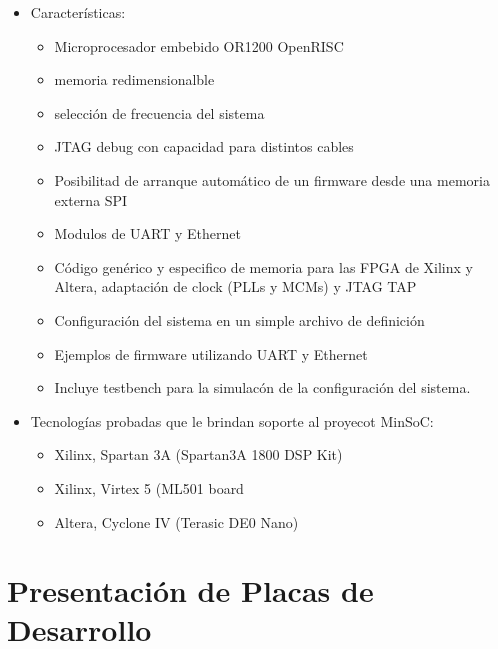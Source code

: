 \begin{itemize}
\item Características:
				\begin{itemize}
				  \item Microprocesador embebido OR1200 OpenRISC 
				  \item memoria redimensionalble
				  \item selección de frecuencia del sistema
				  \item JTAG debug con capacidad para distintos cables
				  \item Posibilitad de arranque automático de un firmware desde una memoria externa SPI
				  \item Modulos de UART y Ethernet 
				  \item Código genérico y especifico de memoria para las FPGA de Xilinx y Altera, adaptación de clock (PLLs y MCMs) y JTAG TAP
				  \item Configuración del sistema en un simple archivo de definición 
				  \item Ejemplos de firmware utilizando UART y Ethernet  
				  \item Incluye testbench para la simulacón de la configuración del sistema. 						
				\end{itemize}

\item Tecnologías probadas que le brindan soporte al proyecot MinSoC:


\begin{itemize}
				  \item Xilinx, Spartan 3A (Spartan3A 1800 DSP Kit)
				  \item Xilinx, Virtex 5 (ML501 board
				  \item Altera, Cyclone IV (Terasic DE0 Nano) 
				\end{itemize}
\end{itemize}

				

\section{Presentación de Placas de Desarrollo}
 
